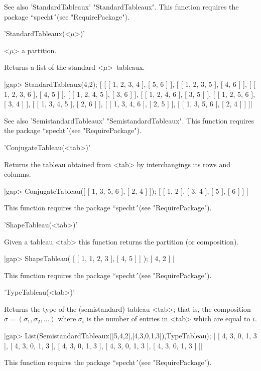 See also 'StandardTableaux' "StandardTableaux". This function requires the 
package ``specht\'\'\ (see "RequirePackage").



'StandardTableaux(<$\mu$>)'

 <$\mu$> a partition.

Returns a list of the standard <$\mu$>--tableaux.

|gap> StandardTableaux(4,2);
[ [ [ 1, 2, 3, 4 ], [ 5, 6 ] ], [ [ 1, 2, 3, 5 ], [ 4, 6 ] ], 
  [ [ 1, 2, 3, 6 ], [ 4, 5 ] ], [ [ 1, 2, 4, 5 ], [ 3, 6 ] ], 
  [ [ 1, 2, 4, 6 ], [ 3, 5 ] ], [ [ 1, 2, 5, 6 ], [ 3, 4 ] ], 
  [ [ 1, 3, 4, 5 ], [ 2, 6 ] ], [ [ 1, 3, 4, 6 ], [ 2, 5 ] ], 
  [ [ 1, 3, 5, 6 ], [ 2, 4 ] ] ]|

See also 'SemistandardTableaux' "SemistandardTableaux". This function requires 
the package ``specht\'\'\ (see "RequirePackage").



'ConjugateTableau(<tab>)'

Returns the tableau obtained from <tab> by interchangings its rows and
columns.

|gap> ConjugateTableau([ [ 1, 3, 5, 6 ], [ 2, 4 ] ]);
[ [ 1, 2 ], [ 3, 4 ], [ 5 ], [ 6 ] ] |

This function requires the package ``specht\'\'\ (see "RequirePackage").



'ShapeTableau(<tab>)'

Given a tableau <tab> this function returns the partition (or composition).

|gap> ShapeTableau( [ [ 1, 1, 2, 3 ], [ 4, 5 ] ] );
[ 4, 2 ] |

This function requires the package ``specht\'\'\ (see "RequirePackage").



'TypeTableau(<tab>)'

Returns the type of the (semistandard) tableau <tab>; that is, the
composition $\sigma=(\sigma_1,\sigma_2,\ldots)$ where $\sigma_i$ is 
the number of entries in <tab> which are equal to $i$.

|gap> List(SemistandardTableaux([5,4,2],[4,3,0,1,3]),TypeTableau);
[ [ 4, 3, 0, 1, 3 ], [ 4, 3, 0, 1, 3 ], [ 4, 3, 0, 1, 3 ], 
  [ 4, 3, 0, 1, 3 ], [ 4, 3, 0, 1, 3 ] ]|

This function requires the package ``specht\'\'\ (see "RequirePackage").


\endinput
